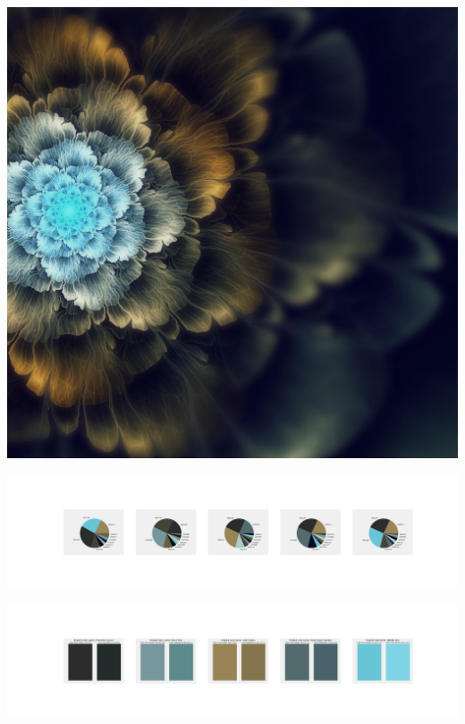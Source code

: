 \documentclass[11pt]{article}
\begin{document}
\begin{landscape}
    \begin{center}
    \includegraphics[width=\textwidth]{./nbimg/file (172).jpg}
    \end{center}

    \begin{center}
    \includegraphics[width=250mm]{./nbimg/pie-81.jpg}
    \end{center}

    \begin{center}
    \includegraphics[width=250mm]{./nbimg/peak-81.jpg}
    \end{center}
    


\end{landscape}
\end{document}
